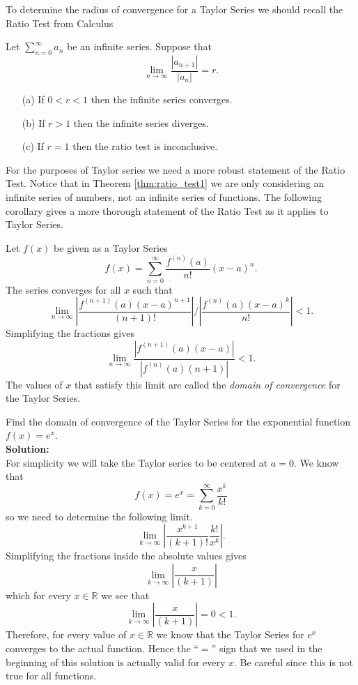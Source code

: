 To determine the
radius of convergence for a Taylor Series we should recall the Ratio Test from Calculus
\begin{thm}\label{thm:ratio_test1}
    Let $\sum_{n=0}^\infty a_n$ be an infinite series.  Suppose that 
    \[ \lim_{n \to \infty} \frac{|a_{n+1}|}{|a_n|} = r. \]
    \begin{enumerate}
        \item[(a)] If $0 < r < 1$ then the infinite series converges.
        \item[(b)] If $r > 1$ then the infinite series diverges.
        \item[(c)] If $r=1$ then the ratio test is inconclusive.
    \end{enumerate}
\end{thm}

For the purposes of Taylor series we need a more robust statement of the Ratio Test.
Notice that in Theorem \ref{thm:ratio_test1} we are only considering an infinite series of
numbers, not an infinite series of functions.  The following corollary gives a more
thorough statement of the Ratio Test as it applies to Taylor Series.

\begin{cor}
    Let $f(x)$ be given as a Taylor Series 
    \[ f(x) = \sum_{n=0}^\infty \frac{f^{(n)}(a)}{n!}(x-a)^n. \]
    The series converges for all $x$ such that 
    \[ \lim_{n \to \infty} \left| \frac{f^{(n+1)}(a) (x-a)^{n+1}}{(n+1)!} \right| \Big/
    \left| \frac{f^{(n)}(a) (x-a)^k}{n!} \right|  < 1. \]
    Simplifying the fractions gives 
    \[ \lim_{n \to \infty}  \frac{|f^{(n+1)}(a) (x-a)|}{|f^{(n)}(a) (n+1)| } <1. \]
    The values of $x$ that satisfy this limit are called the {\it domain of convergence} for
    the Taylor Series.  
\end{cor}

\begin{example}\label{ex:Taylor1}
    Find the domain of convergence of the Taylor Series for the exponential function $f(x)
    = e^x$. \\{\bf Solution:} \\
    For simplicity we will take the Taylor series to be centered at $a=0$.  We know that 
    \[ f(x) = e^x = \sum_{k=0}^\infty \frac{x^k}{k!} \]
    so we need to determine the following limit.
    \[ \lim_{k \to \infty} \left| \frac{x^{k+1}}{(k+1)!} \frac{k!}{x^k} \right|. \]
    Simplifying the fractions inside the absolute values gives
    \[ \lim_{k \to \infty} \left| \frac{x}{(k+1)} \right| \]
    which for every $x \in \mathbb{R}$ we see that 
    \[ \lim_{k \to \infty} \left| \frac{x}{(k+1)} \right| = 0 < 1. \]
    Therefore, for every value of $x \in \mathbb{R}$ we know that the Taylor Series for
    $e^x$ converges to the actual function. Hence the ``$=$'' sign that we used in the
    beginning of this solution is actually valid for every $x$.  Be careful since this is
    not true for all functions.
\end{example}



